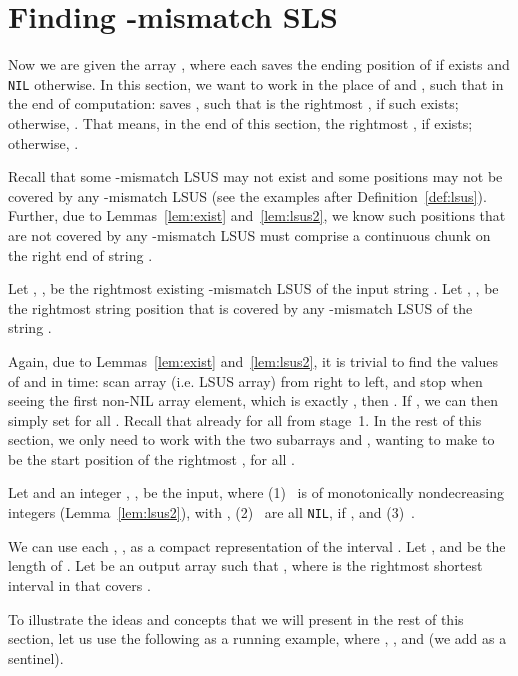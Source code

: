 \documentclass[11pt]{llncs}
\begin{document}
\section{Finding -mismatch SLS}
\label{sec:sls}
Now we are given the array , where each  saves the ending
position of  if  exists and {\tt NIL}
otherwise. In this section, we want to work in the place of  and
, such that in the end of computation:  saves , such that
 is the rightmost , if such  exists;
otherwise, .
That means, in the end of this section, the rightmost , if  exists; otherwise,
.

Recall that some -mismatch LSUS may not exist and some positions
may not be covered by any -mismatch LSUS (see the examples after
Definition~\ref{def:lsus}). Further, due to Lemmas~\ref{lem:exist}
and~\ref{lem:lsus2}, we know such positions that are not covered by any
-mismatch LSUS must comprise a continuous chunk on the right end of
string .

\begin{definition}
\label{def:rz}
Let , , be the rightmost existing
-mismatch LSUS of the input string .
Let , , be the rightmost string position that is
covered by any -mismatch LSUS  of the string .
\end{definition}


Again, due to Lemmas~\ref{lem:exist} and~\ref{lem:lsus2}, it is trivial
to find the values of  and  in  time: scan array  (i.e.
LSUS array) from right to left, and stop when seeing the first
non-NIL  array element, which is exactly , then .
If , we can then simply set 
for all . Recall that 
already for all  from stage~1. In the rest of this section, we 
only need to work with the two subarrays  and , 
wanting to make  to be the start position of the rightmost
, for all .




Let  and an integer , , be the input, where
(1)~ is of monotonically nondecreasing integers
(Lemma~\ref{lem:lsus2}), with , (2)~ are
all {\tt NIL}, if , and (3)~.

We can use each , , as a compact representation of the
interval . Let , and  be the length of . Let
 be an output array such that , where  is the
rightmost shortest interval in  that covers .

\medskip

To illustrate the ideas and
concepts that we will present in the rest of this section, 
let us use the following as a running example, 
where , , and 
(we add
 as a sentinel).

{\small
\begin{center}

\end{center}
}
\end{document}
